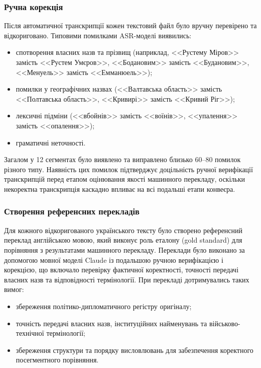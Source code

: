 \subsubsection{Ручна корекція}

Після автоматичної транскрипції кожен текстовий файл було вручну перевірено
та відкориговано. Типовими помилками ASR-моделі виявились:
\begin{itemize}[nosep]
    \item спотворення власних назв та прізвищ (наприклад, <<Рустему Міров>>
    замість <<Рустем Умєров>>, <<Бодановим>> замість <<Будановим>>,
    <<Менуель>> замість <<Емманюель>>);
    \item помилки у географічних назвах (<<Валтавська область>> замість
    <<Полтавська область>>, <<Кривирі>> замість <<Кривий Ріг>>);
    \item лексичні підміни (<<вбойнів>> замість <<воїнів>>, <<упалення>>
    замість <<опалення>>);
    \item граматичні неточності.
\end{itemize}

Загалом у 12 сегментах було виявлено та виправлено близько 60--80 помилок
різного типу. Наявність цих помилок підтверджує доцільність ручної верифікації
транскрипцій перед етапом оцінювання якості машинного перекладу, оскільки
некоректна транскрипція каскадно впливає на всі подальші етапи конвеєра.

\subsubsection{Створення референсних перекладів}

Для кожного відкоригованого українського тексту було створено референсний
переклад англійською мовою, який виконує роль еталону (gold standard) для
порівняння з результатами машинного перекладу. Переклади було виконано за
допомогою  мовної моделі Claude із подальшою ручною
верифікацією і корекцією, що включало перевірку фактичної коректності, точності передачі
власних назв та відповідності термінології. При перекладі дотримувались
таких вимог:
\begin{itemize}[nosep]
    \item збереження політико-дипломатичного регістру оригіналу;
    \item точність передачі власних назв, інституційних найменувань та
    військово-технічної термінології;
    \item збереження структури та порядку висловлювань для забезпечення
    коректного посегментного порівняння.
\end{itemize}

